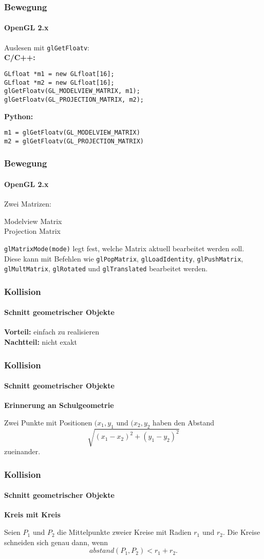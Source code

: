 \documentclass[dvips,12pt,xcolor=table]{beamer}
\begin{document}
\begin{frame}[fragile]
\frametitle{Bewegung}
\framesubtitle{OpenGL 2.x}
Auslesen mit \texttt{glGetFloatv}:\\
\vspace{0.3cm}
\textbf{C/C++:}
\begin{verbatim}
GLfloat *m1 = new GLfloat[16];
GLfloat *m2 = new GLfloat[16];
glGetFloatv(GL_MODELVIEW_MATRIX, m1);
glGetFloatv(GL_PROJECTION_MATRIX, m2);
\end{verbatim}
\vspace{0.3cm}
\textbf{Python:}
\begin{verbatim}
m1 = glGetFloatv(GL_MODELVIEW_MATRIX)
m2 = glGetFloatv(GL_PROJECTION_MATRIX)
\end{verbatim}
\end{frame}

\begin{frame}
\frametitle{Bewegung}
\framesubtitle{OpenGL 2.x}
Zwei Matrizen:
\begin{description}
 \item[Modelview Matrix]
 \item[Projection Matrix]
\end{description}
\texttt{glMatrixMode(mode)} legt fest,
welche Matrix aktuell bearbeitet werden soll.
Diese kann mit Befehlen wie
\texttt{glPopMatrix},
\texttt{glLoadIdentity},
\texttt{glPushMatrix},
\texttt{glMultMatrix},
\texttt{glRotated} und
\texttt{glTranslated}
bearbeitet werden.
\end{frame}


\begin{frame}
\frametitle{Kollision}
\framesubtitle{Schnitt geometrischer Objekte}
\begin{center}


\end{center}
\textbf{Vorteil:} einfach zu realisieren \\
\textbf{Nachtteil:} nicht exakt
\end{frame}

\begin{frame}
\frametitle{Kollision}
\framesubtitle{Schnitt geometrischer Objekte}
\textbf{Erinnerung an Schulgeometrie}

Zwei Punkte mit Positionen $(x_{1},y_{1}$ und $(x_{2},y_{2}$
haben den Abstand
\[ \sqrt{(x_{1}-x_{2})^{2} + (y_{1}-y_{2})^{2}} \]
zueinander.
\end{frame}

\begin{frame}
\frametitle{Kollision}
\framesubtitle{Schnitt geometrischer Objekte}
\textbf{Kreis mit Kreis}

Seien $P_{1}$ und $P_{2}$ die Mittelpunkte zweier Kreise
mit Radien $r_{1}$ und $r_{2}$.
Die Kreise schneiden sich genau dann, wenn
\[ abstand(P_{1}, P_{2}) < r_{1} + r_{2}. \]
\end{frame}
\end{document}
